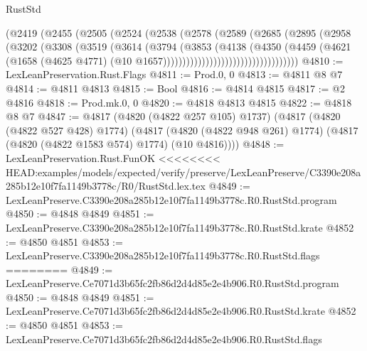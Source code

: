\begin{lexlean}{RustStd}
\begin{coremodule}
{\begin{coremodule}
{{{{{{{{{{{{{{{{{{{{{{{{{{{{{                              (@2419
                                (@2455
                                  (@2505
                                    (@2524
                                      (@2538
                                        (@2578
                                          (@2589
                                            (@2685
                                              (@2895
                                                (@2958
                                                  (@3202
                                                    (@3308
                                                      (@3519
                                                        (@3614
                                                          (@3794
                                                            (@3853
                                                              (@4138
                                                                (@4350
                                                                  (@4459
                                                                    (@4621
                                                                      (@1658
                                                                        (@4625 @4771)
                                                                        (@10
                                                                          @1657)))))))))))))))))))))))))))))))))))
@4810 := LexLeanPreservation.Rust.Flags
@4811 := Prod.{0, 0}
@4813 := @4811 @8 @7
@4814 := @4811 @4813
@4815 := Bool
@4816 := @4814 @4815
@4817 := @2 @4816
@4818 := Prod.mk.{0, 0}
@4820 := @4818 @4813 @4815
@4822 := @4818 @8 @7
@4847 := @4817
    (@4820 (@4822 @257 @105) @1737)
    (@4817
      (@4820 (@4822 @527 @428) @1774)
      (@4817 (@4820 (@4822 @948 @261) @1774) (@4817 (@4820 (@4822 @1583 @574) @1774) (@10 @4816))))
@4848 := LexLeanPreservation.Rust.FunOK
<<<<<<<< HEAD:examples/models/expected/verify/preserve/LexLeanPreserve/C3390e208a285b12e10f7fa1149b3778c/R0/RustStd.lex.tex
@4849 := LexLeanPreserve.C3390e208a285b12e10f7fa1149b3778c.R0.RustStd.program
@4850 := @4848 @4849
@4851 := LexLeanPreserve.C3390e208a285b12e10f7fa1149b3778c.R0.RustStd.krate
@4852 := @4850 @4851
@4853 := LexLeanPreserve.C3390e208a285b12e10f7fa1149b3778c.R0.RustStd.flags
========
@4849 := LexLeanPreserve.Ce7071d3b65fc2fb86d2d4d85e2e4b906.R0.RustStd.program
@4850 := @4848 @4849
@4851 := LexLeanPreserve.Ce7071d3b65fc2fb86d2d4d85e2e4b906.R0.RustStd.krate
@4852 := @4850 @4851
@4853 := LexLeanPreserve.Ce7071d3b65fc2fb86d2d4d85e2e4b906.R0.RustStd.flags
}}}}}}}}}}}}}}}}}}}}}}}}}}}}}
\end{coremodule}}
\end{coremodule}
\end{lexlean}
